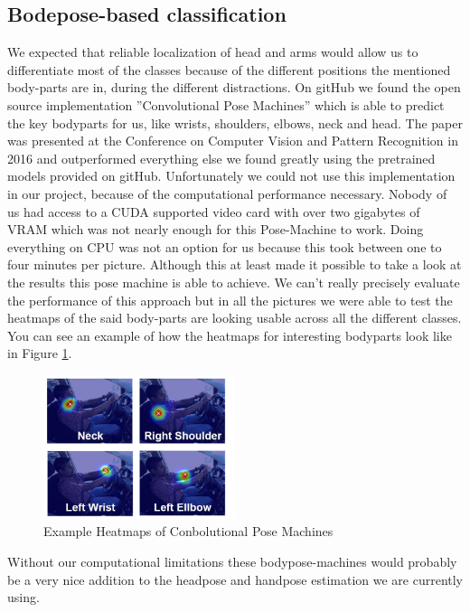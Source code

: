 \documentclass[10pt,twocolumn,letterpaper]{article}
\begin{document}
\subsection{Bodepose-based classification}
We expected that reliable localization of head and arms would allow us to differentiate most of the classes because of the different positions the mentioned body-parts are in, during the different distractions. On gitHub we found the open source implementation ''Convolutional Pose Machines'' which is able to predict the key bodyparts for us, like wrists, shoulders, elbows, neck and head.\cite{DBLP:journals/corr/WeiRKS16} The paper was presented at the Conference on Computer Vision and Pattern Recognition in 2016 and outperformed everything else we found greatly using the pretrained models provided on gitHub. Unfortunately we could not use this implementation in our project, because of the computational performance necessary. Nobody of us had access to a CUDA supported video card with over two gigabytes of VRAM which was not nearly enough for this Pose-Machine to work. Doing everything on CPU was not an option for us because this took between one to four minutes per picture. Although this at least made it possible to take a look at the results this pose machine is able to achieve. We can't really precisely evaluate the performance of this approach but in all the pictures we were able to test the heatmaps of the said body-parts are looking usable across all the different classes. You can see an example of how the heatmaps for interesting bodyparts look like in Figure \ref{BodyPoseExample}.\\
\begin{figure}[h]
    \centering
    \includegraphics[width=0.5\textwidth]{BodyPoseExample}
    \caption{Example Heatmaps of Conbolutional Pose Machines}
    \label{BodyPoseExample}
\end{figure}

Without our computational limitations these bodypose-machines would probably be a very nice addition to the headpose and handpose estimation we are currently using.
\end{document}
